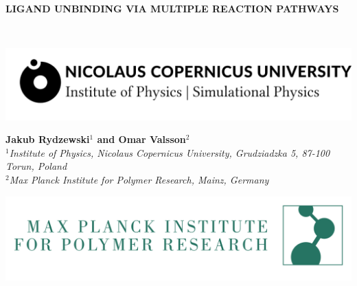 \documentclass[a0]{a0poster}
\begin{document}
\vspace{3cm}
\begin{minipage}[b]{\linewidth}
\veryHuge\centering\color{myblue} 
\textbf{LIGAND UNBINDING VIA MULTIPLE REACTION PATHWAYS}
\end{minipage}
\color{Black}\\[1cm]
\begin{minipage}[b]{0.25\linewidth}
\centering
\includegraphics[width=25cm]{../fig/umk.png}
\end{minipage}%
\begin{minipage}[b]{0.50\linewidth}
  \centering
  \huge \textbf{Jakub Rydzewski$^1$ and Omar Valsson$^2$}\\[1cm]
\Large\textit{$^1$Institute of Physics, Nicolaus Copernicus University,
  Grudziadzka 5, 87-100 Torun, Poland}\\
\Large\textit{$^2$Max Planck Institute for Polymer Research, Mainz, Germany}
\end{minipage}
\begin{minipage}[b]{0.25\linewidth}
\centering
\includegraphics[width=25cm]{../fig/mpip.png}
\end{minipage}%

\vspace{1cm}
\end{document}
